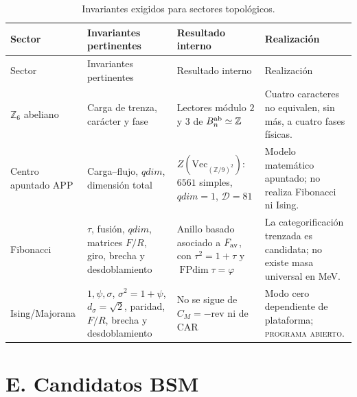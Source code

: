 \begin{longtable}{@{}L{0.18\textwidth}L{0.24\textwidth}L{0.24\textwidth}L{0.25\textwidth}@{}}
\caption{Invariantes exigidos para sectores topológicos.}
\label{tab:catalogo-topologico}\\
\toprule
Sector & Invariantes pertinentes & Resultado interno & Realización\\
\midrule
\endfirsthead
\toprule
Sector & Invariantes pertinentes & Resultado interno & Realización\\
\midrule
\endhead
\(\mathbb Z_6\) abeliano&
Carga de trenza, carácter y fase&
Lectores módulo \(2\) y \(3\) de \(B_n^{\rm ab}\simeq\mathbb Z\)&
Cuatro caracteres no equivalen, sin más, a cuatro fases físicas.\\
Centro apuntado APP&
Carga--flujo, \(qdim\), dimensión total&
\(Z(\mathrm{Vec}_{(\mathbb Z/9)^2})\): \(6561\) simples,
\(qdim=1\), \(\mathcal D=81\)&
Modelo matemático apuntado; no realiza Fibonacci ni Ising.\\
Fibonacci&
\(\tau\), fusión, \(qdim\), matrices \(F/R\), giro, brecha y
desdoblamiento&
Anillo basado asociado a \(F_{\rm av}\), con
\(\tau^2=1+\tau\) y \(\operatorname{FPdim}\tau=\varphi\)&
La categorificación trenzada es candidata; no existe masa universal en
MeV.\\
Ising/Majorana&
\(1,\psi,\sigma\), \(\sigma^2=1+\psi\), \(d_\sigma=\sqrt2\), paridad,
\(F/R\), brecha y desdoblamiento&
No se sigue de \(C_M=-\mathrm{rev}\) ni de CAR&
Modo cero dependiente de plataforma; \textsc{programa abierto}.\\
\bottomrule
\end{longtable}

\section{E. Candidatos BSM}

